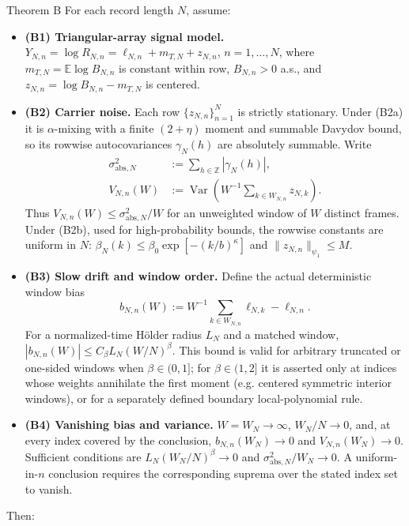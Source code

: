 \begin{namedthm}{Theorem B}
For each record length $N$, assume:
\begin{itemize}
\item \textbf{(B1) Triangular-array signal model.} $Y_{N,n}=\log R_{N,n}=\ell_{N,n}+m_{T,N}+z_{N,n}$, $n=1,\dots,N$, where $m_{T,N}=\mathbb E\log B_{N,n}$ is constant within row, $B_{N,n}>0$ a.s., and $z_{N,n}=\log B_{N,n}-m_{T,N}$ is centered.
\item \textbf{(B2) Carrier noise.} Each row $\{z_{N,n}\}_{n=1}^N$ is strictly stationary. Under (B2a) it is $\alpha$-mixing with a finite $(2+\eta)$ moment and summable Davydov bound, so its rowwise autocovariances $\gamma_N(h)$ are absolutely summable. Write
\[
\begin{aligned}
\sigma_{\mathrm{abs},N}^2
&:=\sum_{h\in\mathbb Z}|\gamma_N(h)|,\\
V_{N,n}(W)
&:=\operatorname{Var}\!\left(W^{-1}\!\sum_{k\in W_{N,n}}z_{N,k}\right).
\end{aligned}
\]
Thus $V_{N,n}(W)\le\sigma_{\mathrm{abs},N}^2/W$ for an unweighted window of $W$ distinct frames. Under (B2b), used for high-probability bounds, the rowwise constants are uniform in $N$: $\beta_N(k)\le\beta_0\exp[-(k/b)^\kappa]$ and $\|z_{N,n}\|_{\psi_1}\le M$.
\item \textbf{(B3) Slow drift and window order.} Define the actual deterministic window bias
\[
b_{N,n}(W):=W^{-1}\sum_{k\in W_{N,n}}\ell_{N,k}-\ell_{N,n}.
\]
For a normalized-time H\"older radius $L_N$ and a matched window, $|b_{N,n}(W)|\le C_\beta L_N(W/N)^\beta$. This bound is valid for arbitrary truncated or one-sided windows when $\beta\in(0,1]$; for $\beta\in(1,2]$ it is asserted only at indices whose weights annihilate the first moment (e.g. centered symmetric interior windows), or for a separately defined boundary local-polynomial rule.
\item \textbf{(B4) Vanishing bias and variance.} $W=W_N\to\infty$, $W_N/N\to0$, and, at every index covered by the conclusion, $b_{N,n}(W_N)\to0$ and $V_{N,n}(W_N)\to0$. Sufficient conditions are $L_N(W_N/N)^\beta\to0$ and $\sigma_{\mathrm{abs},N}^2/W_N\to0$. A uniform-in-$n$ conclusion requires the corresponding suprema over the stated index set to vanish.
\end{itemize}
Then:


\end{namedthm}
